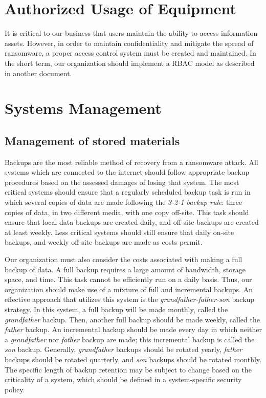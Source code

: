 \documentclass[11pt]{article}
\begin{document}
\section{Authorized Usage of Equipment}
\label{sec:orgb529046}
It is critical to our business that users maintain the ability to access information assets. However, in order to maintain confidentiality and mitigate the spread of ransomware, a proper access control system must be created and maintained. In the short term, our organization should implement a RBAC model as described in another document. 

\section{Systems Management}
\label{sec:org292196f}
\subsection{Management of stored materials}
\label{sec:orgbc0a5e6}
Backups are the most reliable method of recovery from a ransomware attack. All systems which are connected to the internet should follow appropriate backup procedures based on the assessed damages of losing that system. The most critical systems should ensure that a regularly scheduled backup task is run in which several copies of data are made following the \emph{3-2-1 backup rule}: three copies of data, in two different media, with one copy off-site. This task should ensure that local data backups are created daily, and off-site backups are created at least weekly. Less critical systems should still ensure that daily on-site backups, and weekly off-site backups are made as costs permit.

Our organization must also consider the costs associated with making a full backup of data. A full backup requires a large amount of bandwidth, storage space, and time. This task cannot be efficiently run on a daily basis. Thus, our organization should make use of a mixture of full and incremental backups. An effective approach that utilizes this system is the \emph{grandfather-father-son} backup strategy. In this system, a full backup will be made monthly, called the \emph{grandfather} backup. Then, another full backup should be made weekly, called the \emph{father} backup. An incremental backup should be made every day in which neither a \emph{grandfather} nor \emph{father} backup are made; this incremental backup is called the \emph{son} backup. Generally, \emph{grandfather} backups should be rotated yearly, \emph{father} backups should be rotated quarterly, and \emph{son} backups should be rotated monthly. The specific length of backup retention may be subject to change based on the criticality of a system, which should be defined in a system-specific security policy.
\end{document}
